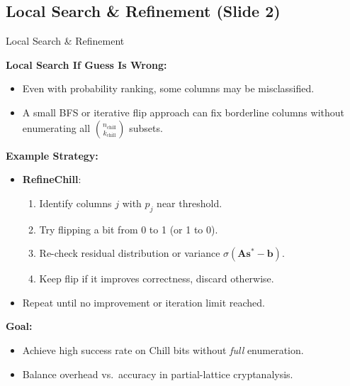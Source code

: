 \documentclass{beamer}
\begin{document}
\subsection*{Local Search \& Refinement (Slide 2)}
\begin{frame}{Local Search \& Refinement}

\textbf{Local Search If Guess Is Wrong:}
\begin{itemize}
  \item Even with probability ranking, some columns may be misclassified.
  \item A small BFS or iterative flip approach can fix borderline columns without enumerating all 
    $\binom{n_{\mathrm{chill}}}{k_{\mathrm{chill}}}$ subsets.
\end{itemize}

\textbf{Example Strategy:}
\begin{itemize}
  \item \textbf{RefineChill}:
    \begin{enumerate}
      \item Identify columns $j$ with $p_j$ near threshold.
      \item Try flipping a bit from 0 to 1 (or 1 to 0).
      \item Re-check residual distribution or variance $\sigma(\mathbf{A}\mathbf{s}^* - \mathbf{b})$.
      \item Keep flip if it improves correctness, discard otherwise.
    \end{enumerate}
  \item Repeat until no improvement or iteration limit reached.
\end{itemize}

\textbf{Goal:}
\begin{itemize}
  \item Achieve high success rate on Chill bits without \emph{full} enumeration.
  \item Balance overhead vs.\ accuracy in partial-lattice cryptanalysis.
\end{itemize}
\end{frame}

\end{document}
